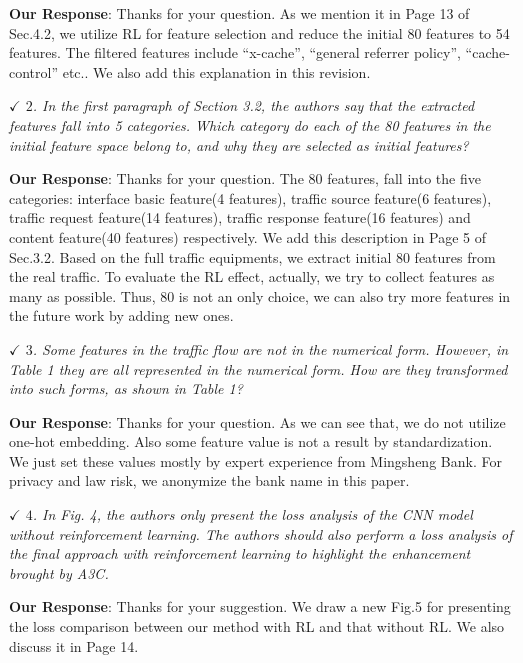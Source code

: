 \documentclass{amsart}
\theoremstyle{definition}
\theoremstyle{remark}
\numberwithin{equation}{section}
\begin{document}
\textbf{Our Response}:
	Thanks for your question. As we mention it in Page 13 of Sec.4.2, we utilize RL for feature selection and reduce   the initial 80 features to 54 features. The filtered features include ``x-cache'', ``general referrer policy'', ``cache-control'' etc.. We also add this explanation in this revision.


\emph{$\checkmark$ $2$. In the first paragraph of Section 3.2, the authors say that the extracted features fall into 5 categories. Which category do each of the 80 features in the initial feature space belong to, and why they are selected as initial features?}

\textbf{Our Response}:
	Thanks for your question. The 80 features, fall into
	the five categories: interface basic feature(4 features), traffic source feature(6 features), 
	traffic request feature(14 features), traffic response feature(16 features) and content feature(40 features) respectively. We add this description in Page 5 of Sec.3.2. Based on the full traffic equipments, we extract initial 80 features from the real traffic. To evaluate the RL effect, actually, we try to collect features as many as possible. Thus, 80 is not an only choice, we can also try more features in the future work by adding new ones.
	


\emph{$\checkmark$ $3$. Some features in the traffic flow are not in the numerical form. However, in Table 1 they are all represented in the numerical form. How are they transformed into such forms, as shown in Table 1?}

\textbf{Our Response}:
	Thanks for your question. As we can see that, we do not 
	utilize one-hot embedding. Also some feature value is not a result by standardization. We just set these values mostly by expert experience from Mingsheng Bank. For privacy and law risk, we anonymize the bank name in this paper. 

\emph{$\checkmark$ $4$. In Fig. 4, the authors only present the loss analysis of the CNN model without reinforcement learning. The authors should also perform a loss analysis of the final approach with reinforcement learning to highlight the enhancement brought by A3C.}

\textbf{Our Response}:
	Thanks for your suggestion. We draw a new Fig.5 for presenting the loss comparison between our method with RL and that without RL. We also discuss it in Page 14. 
\end{document}

